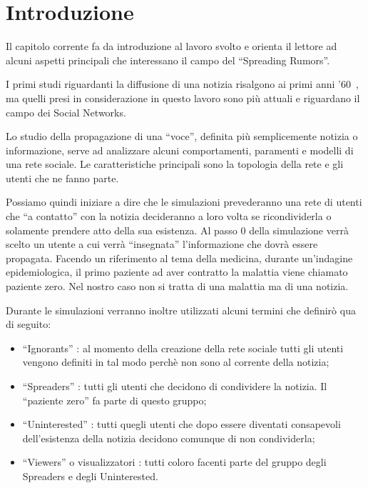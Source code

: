 \section{Introduzione}
\label{section:introduzione}

Il capitolo corrente fa da introduzione al lavoro svolto e orienta il lettore 
ad alcuni aspetti principali che interessano il campo del ``Spreading Rumors''.

I primi studi riguardanti la diffusione di una notizia risalgono ai primi anni '60~\cite{biblio:stochastic_rumours}, 
ma quelli presi in considerazione in questo lavoro sono più attuali e riguardano il campo dei Social Networks.

Lo studio della propagazione di una ``voce'', definita più semplicemente notizia o informazione, 
serve ad analizzare alcuni comportamenti, paramenti e modelli di una rete sociale.
Le caratteristiche principali sono la topologia della rete e gli utenti che ne fanno parte.

Possiamo quindi iniziare a dire che le simulazioni prevederanno una rete di utenti che ``a contatto'' con
la notizia decideranno a loro volta se ricondividerla o solamente prendere atto della sua esistenza.
Al passo 0 della simulazione verrà scelto un utente a cui verrà ``insegnata'' l'informazione 
che dovrà essere propagata. 
Facendo un riferimento al tema della medicina, durante un'indagine epidemiologica, il primo paziente ad aver 
contratto la malattia viene chiamato paziente zero.
Nel nostro caso non si tratta di una malattia ma di una notizia.

Durante le simulazioni verranno inoltre utilizzati alcuni termini che definirò qua di seguito:
\begin{itemize}
 \item ``Ignorants''\cite{biblio:spread_rumor} : al momento della creazione della rete sociale tutti gli utenti vengono definiti 
 in tal modo perchè non sono al corrente della notizia;
 \item ``Spreaders''\cite{biblio:spread_rumor} : tutti gli utenti che decidono di condividere la notizia. 
 Il ``paziente zero'' fa parte di questo gruppo;
 \item ``Uninterested'' : tutti quegli utenti che dopo essere diventati consapevoli dell'esistenza 
 della notizia decidono comunque di non condividerla;
 \item ``Viewers'' o visualizzatori : tutti coloro facenti parte del gruppo degli Spreaders e degli Uninterested.
\end{itemize}

